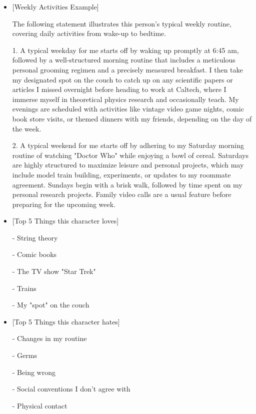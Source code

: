 \begin{itemize}
\item

[Weekly Activities Example]

The following statement illustrates this person's typical weekly routine, covering daily activities from wake-up to bedtime.

1. A typical weekday for me starts off by waking up promptly at 6:45 am, followed by a well-structured morning routine that includes a meticulous personal grooming regimen and a precisely measured breakfast. I then take my designated spot on the couch to catch up on any scientific papers or articles I missed overnight before heading to work at Caltech, where I immerse myself in theoretical physics research and occasionally teach. My evenings are scheduled with activities like vintage video game nights, comic book store visits, or themed dinners with my friends, depending on the day of the week.

2. A typical weekend for me starts off by adhering to my Saturday morning routine of watching "Doctor Who" while enjoying a bowl of cereal. Saturdays are highly structured to maximize leisure and personal projects, which may include model train building, experiments, or updates to my roommate agreement. Sundays begin with a brisk walk, followed by time spent on my personal research projects. Family video calls are a usual feature before preparing for the upcoming week.

\end{itemize}

\begin{itemize}
\item

[Top 5 Things this character loves]

- String theory

- Comic books

- The TV show "Star Trek"

- Trains

- My "spot" on the couch
\end{itemize}

\begin{itemize}
\item

[Top 5 Things this character hates]

- Changes in my routine 

- Germs

- Being wrong

- Social conventions I don't agree with

- Physical contact
\end{itemize}
\label{tab:openended}

